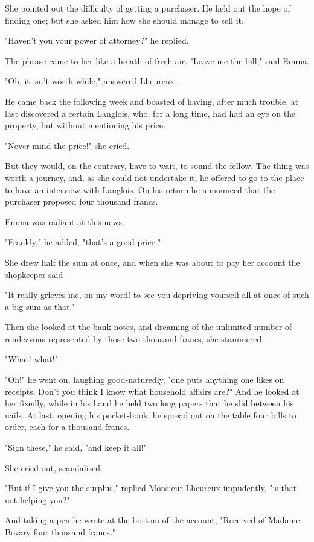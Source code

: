 \documentclass[11pt,twocolumn]{ltugboat}
\begin{document}
She pointed out the difficulty of getting a purchaser. He held out the
hope of finding one; but she asked him how she should manage to sell it.

"Haven't you your power of attorney?" he replied.

The phrase came to her like a breath of fresh air. "Leave me the bill,"
said Emma.

"Oh, it isn't worth while," answered Lheureux.

He came back the following week and boasted of having, after much
trouble, at last discovered a certain Langlois, who, for a long time,
had had an eye on the property, but without mentioning his price.

"Never mind the price!" she cried.

But they would, on the contrary, have to wait, to sound the fellow.
The thing was worth a journey, and, as she could not undertake it, he
offered to go to the place to have an interview with Langlois. On his
return he announced that the purchaser proposed four thousand francs.

Emma was radiant at this news.

"Frankly," he added, "that's a good price."

She drew half the sum at once, and when she was about to pay her account
the shopkeeper said--

"It really grieves me, on my word! to see you depriving yourself all at
once of such a big sum as that."

Then she looked at the bank-notes, and dreaming of the unlimited number
of rendezvous represented by those two thousand francs, she stammered--

"What! what!"

"Oh!" he went on, laughing good-naturedly, "one puts anything one likes
on receipts. Don't you think I know what household affairs are?" And he
looked at her fixedly, while in his hand he held two long papers that he
slid between his nails. At last, opening his pocket-book, he spread out
on the table four bills to order, each for a thousand francs.

"Sign these," he said, "and keep it all!"

She cried out, scandalised.

"But if I give you the surplus," replied Monsieur Lheureux impudently,
"is that not helping you?"

And taking a pen he wrote at the bottom of the account, "Received of
Madame Bovary four thousand francs."
\end{document}
